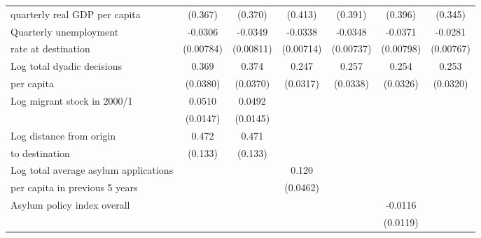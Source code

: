 \begin{table}[!ht]
\begin{tabular}{l*{6}{c}}
 quarterly real GDP per capita                    &     (0.367)         &     (0.370)         &     (0.413)         &     (0.391)         &     (0.396)         &     (0.345)         \\
[0,5em]
Quarterly unemployment&     -0.0306\sym{***}&     -0.0349\sym{***}&     -0.0338\sym{***}&     -0.0348\sym{***}&     -0.0371\sym{***}&     -0.0281\sym{***}\\
 rate at destination                    &   (0.00784)         &   (0.00811)         &   (0.00714)         &   (0.00737)         &   (0.00798)         &   (0.00767)         \\
[0,5em]
Log total dyadic decisions&       0.369\sym{***}&       0.374\sym{***}&       0.247\sym{***}&       0.257\sym{***}&       0.254\sym{***}&       0.253\sym{***}\\
per capita                    &    (0.0380)         &    (0.0370)         &    (0.0317)         &    (0.0338)         &    (0.0326)         &    (0.0320)         \\
[0,5em]
Log migrant stock in 2000/1&      0.0510\sym{**} &      0.0492\sym{**} &                     &                     &                     &                     \\
                    &    (0.0147)         &    (0.0145)         &                     &                     &                     &                     \\
[0,5em]
Log distance from origin&       0.472\sym{***}&       0.471\sym{***}&                     &                     &                     &                     \\
 to destination                    &     (0.133)         &     (0.133)         &                     &                     &                     &                     \\
[0,5em]
Log total average asylum applications&                     &                     &       0.120\sym{*}  &                     &                     &                     \\
 per capita in previous 5 years                    &                     &                     &    (0.0462)         &                     &                     &                     \\
[0,5em]
Asylum policy index overall&                     &                     &                     &                     &     -0.0116         &                     \\
                    &                     &                     &                     &                     &    (0.0119)         &                     \\

\end{tabular}
\end{table}
